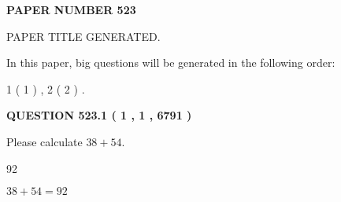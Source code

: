 \documentclass[12pt]{article}
\begin{document}
   
   
   
\newpage 
\setcounter{page}{ 
   523001 } 
   
   
   
   
 {\textbf{ \Large{ PAPER NUMBER  523  }}}
   
   
\vspace{0.2in}
   
   
   
   
   
   
   
   
 \vspace{0.2in}
 
 
 
 
   
   
 PAPER TITLE GENERATED.
   
   
   
\vspace{0.2in}
   
In this paper, big questions will be generated in the following order: 
   
   
   1 ( 1 )
 ,
   2 ( 2 )
 .
  
\vspace{0.2in}
  
{\textbf{\Large{QUESTION
523.1 
 ( 1 , 1 , 6791 )
}}}
  
  
 
Please calculate $ %
38 +  %
54 $.
 
 
 
\noindent{}
 
 

92
 
 
\noindent{}
 
 

 
 
 
\noindent{}
 
 

$ %
38 +  %
54=   %
92$
 
 
\noindent{}
 
 

 
   
   
   
\end{document}
